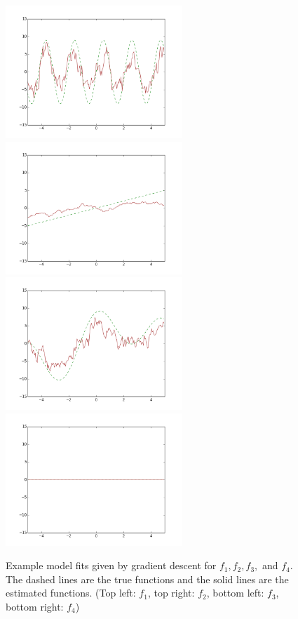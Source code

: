 \documentclass[12pt]{article}
\begin{document}
\begin{figure}
\caption{Example model fits given by gradient descent for $f_1, f_2, f_3,$ and $ f_4$. The dashed lines are the true functions and the solid lines are the estimated functions. (Top left: $f_1$, top right: $f_2$, bottom left: $f_3$, bottom right: $f_4$)}
\centering
\includegraphics[height=50mm]{sparse_add_model_3_20_100_50_50_func0.png}
\includegraphics[height=50mm]{sparse_add_model_3_20_100_50_50_func1.png}
\includegraphics[height=50mm]{sparse_add_model_3_20_100_50_50_func2.png}
\includegraphics[height=50mm]{sparse_add_model_3_20_100_50_50_func3.png}
\label{fig:additive}
\end{figure}
\end{document}
